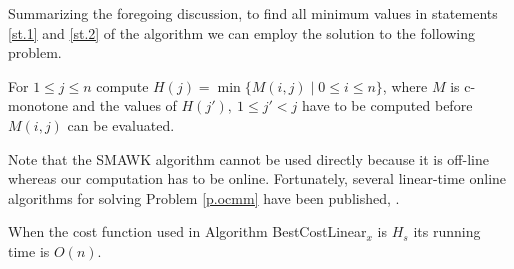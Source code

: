 Summarizing the foregoing discussion, to find all minimum values in statements \ref{st.1} and \ref{st.2} of the algorithm we can employ the solution to the following problem.
\begin{problem}\label{p.ocmm}
		For $1\leq j \leq n$ compute $H(j)=\min \{M(i,j) \mid 0\leq i \leq n\}$, where 
		$M$ is c-monotone and
	the values of $H(j'),\ 1\leq j'<j$ have to be computed before $M(i,j)$ can be evaluated.
\end{problem}
Note that the SMAWK algorithm cannot
be used directly because it is off-line whereas our computation has to be online.
Fortunately, several linear-time online algorithms for solving Problem \ref{p.ocmm} have been published, 
\cite{klawe89,larmore91,galil92,barnoy09}.

\begin{theorem}\label{t.linear-s}
	When the cost function used in Algorithm BestCostLinear$_x$ is $H_s$ its running time is $O(n)$.
\end{theorem}

\

